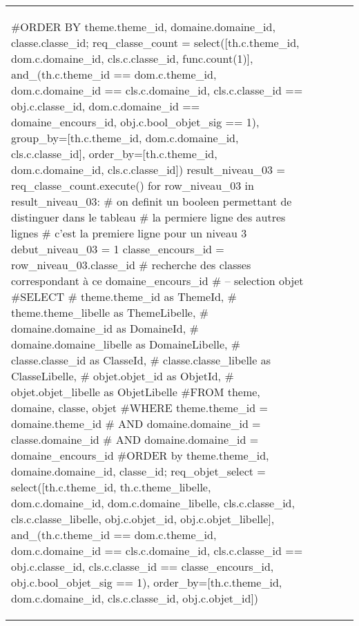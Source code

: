 \documentclass[12pt,titlepage,oneside]{book}
\begin{document}
\begin{supertabular}{|p{7.5cm}|p{7.5cm}|p{7.5cm}|c|p{10cm}|}
\begin{lbdpython}
      #ORDER BY theme.theme_id, domaine.domaine_id, classe.classe_id;
      req_classe_count = select([th.c.theme_id, dom.c.domaine_id,
                                 cls.c.classe_id, func.count(1)],
                         and_(th.c.theme_id == dom.c.theme_id,
                              dom.c.domaine_id == cls.c.domaine_id,
                              cls.c.classe_id == obj.c.classe_id,
                              dom.c.domaine_id == domaine_encours_id,
                              obj.c.bool_objet_sig == 1),
                         group_by=[th.c.theme_id, dom.c.domaine_id, cls.c.classe_id],
                         order_by=[th.c.theme_id, dom.c.domaine_id, cls.c.classe_id])
      result_niveau_03 = req_classe_count.execute()
      for row_niveau_03 in result_niveau_03:
         # on definit un booleen permettant de distinguer dans le tableau
         # la permiere ligne des autres lignes
         # c'est la premiere ligne pour un niveau 3
         debut_niveau_03 = 1
         classe_encours_id = row_niveau_03.classe_id
         # recherche des classes correspondant à ce domaine_encours_id
         # -- selection objet
         #SELECT
         #   theme.theme_id as ThemeId,
         #   theme.theme_libelle as ThemeLibelle,
         #   domaine.domaine_id as DomaineId,
         #   domaine.domaine_libelle as DomaineLibelle,
         #   classe.classe_id as ClasseId,
         #   classe.classe_libelle as ClasseLibelle,
         #   objet.objet_id as ObjetId,
         #   objet.objet_libelle as ObjetLibelle
         #FROM theme, domaine, classe, objet
         #WHERE theme.theme_id = domaine.theme_id
         #  AND domaine.domaine_id = classe.domaine_id
         #  AND domaine.domaine_id = domaine_encours_id
         #ORDER by theme.theme_id, domaine.domaine_id, classe_id;
         req_objet_select = select([th.c.theme_id, th.c.theme_libelle,
                                    dom.c.domaine_id, dom.c.domaine_libelle,
                                    cls.c.classe_id, cls.c.classe_libelle,
                                    obj.c.objet_id, obj.c.objet_libelle],
                              and_(th.c.theme_id == dom.c.theme_id,
                                   dom.c.domaine_id == cls.c.domaine_id,                              
                                   cls.c.classe_id == obj.c.classe_id,                              
                                   cls.c.classe_id == classe_encours_id,
                                   obj.c.bool_objet_sig == 1),
                              order_by=[th.c.theme_id, dom.c.domaine_id, cls.c.classe_id, obj.c.objet_id])

\end{lbdpython}
\end{supertabular}
\end{document}
